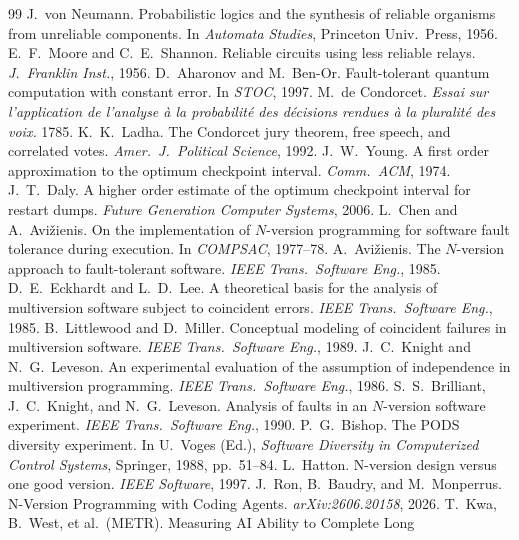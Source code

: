 \documentclass[11pt]{article}
\theoremstyle{remark}
\begin{document}
\begin{thebibliography}{99}
\small
{} J.~von Neumann. Probabilistic logics and the synthesis of reliable
organisms from unreliable components.
In \emph{Automata Studies}, Princeton Univ.\ Press, 1956.
 E.~F.~Moore and C.~E.~Shannon. Reliable circuits using less reliable relays.
\emph{J.~Franklin Inst.}, 1956.
 D.~Aharonov and M.~Ben-Or. Fault-tolerant quantum computation with constant
error. In \emph{STOC}, 1997.
 M.~de Condorcet.
\emph{Essai sur l'application de l'analyse \`a la
probabilit\'e des d\'ecisions rendues \`a la pluralit\'e des voix.} 1785.
 K.~K.~Ladha.
The Condorcet jury theorem, free speech, and correlated votes.
\emph{Amer.\ J.\ Political Science}, 1992.
 J.~W.~Young.
A first order approximation to the optimum checkpoint interval.
\emph{Comm.\ ACM}, 1974.
 J.~T.~Daly.
A higher order estimate of the optimum checkpoint interval for
restart dumps.
\emph{Future Generation Computer Systems}, 2006.
 L.~Chen and A.~Avi\v{z}ienis.
On the implementation of $N$-version
programming for software fault tolerance during execution. In \emph{COMPSAC}, 1977--78.
 A.~Avi\v{z}ienis.
The $N$-version approach to fault-tolerant software.
\emph{IEEE Trans.\ Software Eng.}, 1985.
 D.~E.~Eckhardt and L.~D.~Lee.
A theoretical basis for the analysis of
multiversion software subject to coincident errors. \emph{IEEE Trans.\ Software Eng.}, 1985.
 B.~Littlewood and D.~Miller.
Conceptual modeling of coincident failures
in multiversion software. \emph{IEEE Trans.\ Software Eng.}, 1989.
 J.~C.~Knight and N.~G.~Leveson.
An experimental evaluation of the assumption
of independence in multiversion programming. \emph{IEEE Trans.\ Software Eng.}, 1986.
 S.~S.~Brilliant, J.~C.~Knight, and N.~G.~Leveson.
Analysis of faults in an
$N$-version software experiment. \emph{IEEE Trans.\ Software Eng.}, 1990.
 P.~G.~Bishop.
The PODS diversity experiment.
In U.~Voges (Ed.), \emph{Software Diversity in Computerized Control Systems}, Springer, 1988,
pp.~51--84.
 L.~Hatton. N-version design versus one good version.
\emph{IEEE Software},
1997.
 J.~Ron, B.~Baudry, and M.~Monperrus. N-Version Programming with Coding Agents.
\emph{arXiv:2606.20158}, 2026.
 T.~Kwa, B.~West, et al.\ (METR). Measuring AI Ability to Complete Long

\end{thebibliography}
\end{document}
